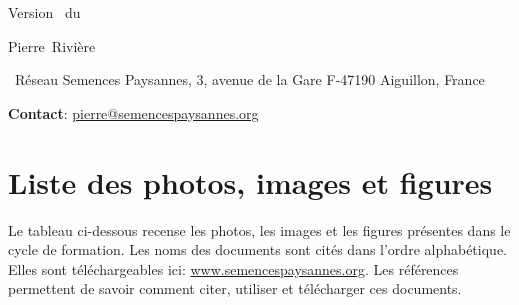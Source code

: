 


\graphicspath{{../../ressources/figures/}}




\begin{center}

\vfill

\large
Version \versionPIF~du \dateversionPIF

\vfill

\normalsize

Pierre~Rivière
\end{center}

\small
\noindent{}~Réseau Semences Paysannes, 3, avenue de la Gare F-47190 Aiguillon, France 

\noindent\up{*} \textbf{Contact}: \href{mailto:pierre@semencespaysannes.org}{\textcolor{mln-green} {pierre@semencespaysannes.org}}

\normalsize

\vfill


\newpage \pagestyle{plain}

\section*{Liste des photos, images et figures}
Le tableau ci-dessous recense les photos, les images et les figures présentes dans le cycle de formation.
Les noms des documents sont cités dans l'ordre alphabétique.
Elles sont téléchargeables ici: \url{www.semencespaysannes.org}.
Les références permettent de savoir comment citer, utiliser et télécharger ces documents.

